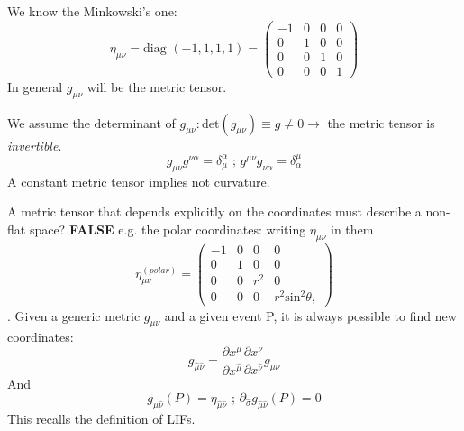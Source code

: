 We know the Minkowski's one:
\begin{equation}
\eta_{\mu \nu } = \text{diag }\left( -1,1,1,1 \right) = \begin{pmatrix}
-1 & 0 & 0 & 0 \\
0 & 1 & 0 & 0 \\
0 & 0 & 1 & 0 \\
0 & 0 & 0 & 1
\end{pmatrix} 
\end{equation}
\bigskip
In general $g_{\mu \nu }$ will be the metric tensor.\par
We assume the determinant of $g_{\mu \nu }: \text{det}\left( g_{\mu \nu } \right) \equiv g \neq 0 \to $ the metric tensor is \emph{invertible}.
\[
g_{\mu \nu }g^{\nu \alpha } = \delta^{\alpha }_{\mu } \text{ ; } g^{\mu \nu }g_{\nu \alpha } = \delta^{\mu }_{\alpha }
\]
A constant metric tensor implies not curvature.\par
A metric tensor that depends explicitly on the coordinates must describe a non-flat space? \textbf{FALSE} e.g. the polar coordinates: writing $\eta_{\mu \nu }$ in them
\begin{equation}
\eta_{\mu \nu }^{\left(polar\right)} = \begin{pmatrix}
-1 & 0 & 0 & 0 \\
0 & 1 & 0 & 0 \\
0 & 0 & r^{2} & 0 \\
0 & 0 & 0 & r^{2} \text{sin}^{2}\theta ,
\end{pmatrix} 
\end{equation}.
Given a generic metric $g_{\mu \nu }$ and a given event P, it is always possible to find new coordinates:
\[
g_{\hat{\mu }\hat{\nu }} = \frac{\partial x^{\mu }}{\partial x^{\hat{\mu }}} \frac{\partial x^{\nu }}{\partial x^{\hat{\nu }}} g_{\mu \nu }
\]
And
\[
g_{\hat{\mu }\hat{\nu }}\left( P \right) = \eta_{\hat{\mu }\hat{\nu }} \text{ ; } \partial_{\hat{\sigma }}g_{\hat{\mu }\hat{\nu }}\left( P \right)=0
\]
This recalls the definition of LIFs.

